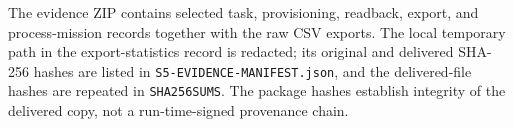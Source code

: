 \documentclass[journal]{IEEEtran}
\begin{document}
The evidence ZIP contains selected task, provisioning, readback, export, and
process-mission records together with the raw CSV exports. The local temporary
path in the export-statistics record is redacted; its original and delivered
SHA-256 hashes are listed in \texttt{S5-EVIDENCE-MANIFEST.json}, and the
delivered-file hashes are repeated in \texttt{SHA256SUMS}. The package hashes
establish integrity of the delivered copy, not a run-time-signed provenance
chain.
\end{document}
